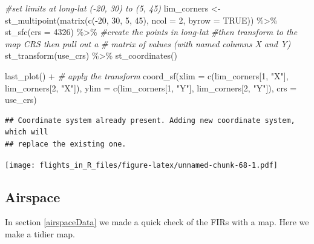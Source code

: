 \documentclass[
]{book}
\newenvironment{Shaded}{\begin{snugshade}}{\end{snugshade}}
\newcommand{\AttributeTok}[1]{\textcolor[rgb]{0.77,0.63,0.00}{#1}}
\newcommand{\CommentTok}[1]{\textcolor[rgb]{0.56,0.35,0.01}{\textit{#1}}}
\newcommand{\ConstantTok}[1]{\textcolor[rgb]{0.00,0.00,0.00}{#1}}
\newcommand{\DecValTok}[1]{\textcolor[rgb]{0.00,0.00,0.81}{#1}}
\newcommand{\FunctionTok}[1]{\textcolor[rgb]{0.00,0.00,0.00}{#1}}
\newcommand{\NormalTok}[1]{#1}
\newcommand{\OtherTok}[1]{\textcolor[rgb]{0.56,0.35,0.01}{#1}}
\newcommand{\SpecialCharTok}[1]{\textcolor[rgb]{0.00,0.00,0.00}{#1}}
\newcommand{\StringTok}[1]{\textcolor[rgb]{0.31,0.60,0.02}{#1}}
\begin{document}
\begin{Shaded}
\begin{Highlighting}[]
\CommentTok{\#set limits at long{-}lat ({-}20, 30) to (5, 45)}
\NormalTok{lim\_corners }\OtherTok{\textless{}{-}} \FunctionTok{st\_multipoint}\NormalTok{(}\FunctionTok{matrix}\NormalTok{(}\FunctionTok{c}\NormalTok{(}\SpecialCharTok{{-}}\DecValTok{20}\NormalTok{, }\DecValTok{30}\NormalTok{, }\DecValTok{5}\NormalTok{, }\DecValTok{45}\NormalTok{), }\AttributeTok{ncol =} \DecValTok{2}\NormalTok{, }\AttributeTok{byrow =} \ConstantTok{TRUE}\NormalTok{)) }\SpecialCharTok{\%\textgreater{}\%} 
  \FunctionTok{st\_sfc}\NormalTok{(}\AttributeTok{crs =} \DecValTok{4326}\NormalTok{) }\SpecialCharTok{\%\textgreater{}\%} \CommentTok{\#create the points in long{-}lat}
  \CommentTok{\#then transform to the map CRS then pull out a }
  \CommentTok{\#   matrix of values (with named columns X and Y)}
  \FunctionTok{st\_transform}\NormalTok{(use\_crs) }\SpecialCharTok{\%\textgreater{}\%} 
  \FunctionTok{st\_coordinates}\NormalTok{()}

\FunctionTok{last\_plot}\NormalTok{() }\SpecialCharTok{+}
  \CommentTok{\# apply the transform}
  \FunctionTok{coord\_sf}\NormalTok{(}\AttributeTok{xlim =} \FunctionTok{c}\NormalTok{(lim\_corners[}\DecValTok{1}\NormalTok{, }\StringTok{"X"}\NormalTok{], lim\_corners[}\DecValTok{2}\NormalTok{, }\StringTok{"X"}\NormalTok{]), }
           \AttributeTok{ylim =} \FunctionTok{c}\NormalTok{(lim\_corners[}\DecValTok{1}\NormalTok{, }\StringTok{"Y"}\NormalTok{], lim\_corners[}\DecValTok{2}\NormalTok{, }\StringTok{"Y"}\NormalTok{]),}
           \AttributeTok{crs =}\NormalTok{ use\_crs)}
\end{Highlighting}
\end{Shaded}

\begin{verbatim}
## Coordinate system already present. Adding new coordinate system, which will
## replace the existing one.
\end{verbatim}

\texttt{[image: flights\_in\_R\_files/figure-latex/unnamed-chunk-68-1.pdf]}

\hypertarget{mapAirspace}{%
\subsection{Airspace}\label{mapAirspace}}

In section \ref{airspaceData} we made a quick check of the FIRs with a map. Here we make a tidier map.
\end{document}
